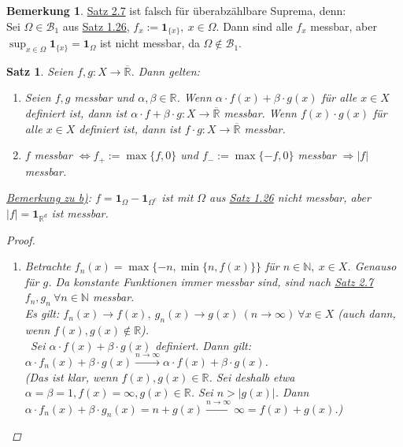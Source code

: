 \documentclass[a4paper]{report}
\newcommand{\doubleOne}{\textbf{1}}
\newcommand{\R}{\mathbb{R}}
\newcommand{\Rq}{\overline{\R}}
\newcommand{\N}{\mathbb{N}}
\newcommand{\Borel}{\mathcal{B}}
\newcommand{\jlabel}[1]{\label{j_#1}}
\newcommand{\jhyperref}[2]{\hyperref[j_#1]{#2}}
\newcommand{\jlink}[1]{\jhyperref{#1}{#1}}
\newcommand{\jabb}[3]{ #1: #2 \rightarrow #3 }
\theoremstyle{plain}
\newtheorem{satz}[thm]{Satz}
\theoremstyle{definition}
\newtheorem*{bem*}{Bemerkung}
\begin{document}
{{{\begin{bem*}
    \jlink{Satz 2.7} ist falsch für überabzählbare Suprema, denn:\\
    Sei $\Omega \in \Borel_1$ aus \jlink{Satz 1.26}, $f_x := \doubleOne_{\{x\}}, \ x \in \Omega$. Dann sind alle $f_x$ messbar, aber $\sup_{x\in\Omega} \doubleOne_{\{x\}} = \doubleOne_\Omega$ ist nicht messbar, da $\Omega \notin \Borel_1$.
\end{bem*}

\begin{satz}
\jlabel{Satz 2.8}
    Seien $\jabb{f,g}{X}{\Rq}$. Dann gelten:
    \begin{enumerate}
        \item 
            Seien $f,g$ messbar und $\alpha, \beta \in \R$. Wenn $\alpha\cdot f(x) + \beta\cdot g(x)$ für alle $x\in X$ definiert ist, dann ist $\jabb{\alpha\cdot f + \beta\cdot g}{X}{\Rq}$ messbar. Wenn $f(x)\cdot g(x)$ für alle $x\in X$ definiert ist, dann ist $\jabb{f\cdot g}{X}{\Rq}$ messbar.
        \item
            $f$ messbar $\Leftrightarrow f_+ := \max\{f,0\}$ und $f_- := \max\{-f,0\}$ messbar $\Rightarrow |f|$ messbar.
    \end{enumerate}
    \uline{Bemerkung zu b)}: $f = \doubleOne_\Omega - \doubleOne_{\Omega^c}$ ist mit $\Omega$ aus \jlink{Satz 1.26} nicht messbar, aber $|f| = \doubleOne_{\R^d}$ ist messbar.
    \begin{proof}
        \begin{enumerate}
            \item 
                Betrachte $f_n(x) = \max \{-n, \min\{n, f(x)\}\}$ für $n\in\N, \ x\in X$. Genauso für $g$. Da konstante Funktionen immer messbar sind, sind nach \jlink{Satz 2.7} $f_n, g_n \ \forall n\in\N$ messbar.\\
                Es gilt: $f_n(x) \rightarrow f(x), \ g_n(x) \rightarrow g(x) \ (n\rightarrow \infty) \ \forall x\in X$ (auch dann, wenn $f(x),g(x) \notin \R$).\\\
                Sei $\alpha\cdot f(x) + \beta \cdot g(x)$ definiert. Dann gilt:\\
                $\alpha\cdot f_n(x) + \beta\cdot g(x)\xrightarrow{n\rightarrow\infty} \alpha\cdot f(x) + \beta \cdot g(x)$.\\
                (Das ist klar, wenn $f(x), g(x) \in \R$. Sei deshalb etwa $\alpha=\beta=1, f(x)=\infty, g(x)\in\R$. Sei $n>|g(x)|$. Dann $\alpha\cdot f_n(x) + \beta\cdot g_n(x) = n + g(x) \xrightarrow{n\rightarrow \infty} \infty = f(x)+g(x)$.)\\

\end{enumerate}
\end{proof}
\end{satz}}}}
\end{document}
